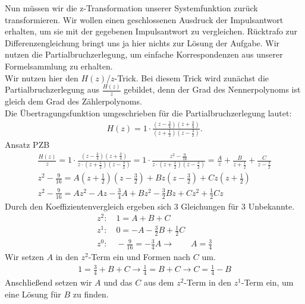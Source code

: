 \documentclass[11pt,a4paper,DIV=12]{scrartcl}
\begin{document}
Nun müssen wir die z-Transformation unserer Systemfunktion zurück
transformieren.
%
Wir wollen einen geschlossenen Ausdruck der Impulsantwort erhalten, um sie
mit der gegebenen Impulsantwort zu vergleichen.
%
Rücktrafo zur Differenzengleichung bringt uns ja hier nichts zur Lösung der
Aufgabe.
%
Wir nutzen die Partialbruchzerlegung, um einfache Korrespondenzen aus unserer
Formelsammlung zu erhalten.\\
%
Wir nutzen hier den $H(z)$/$z$-Trick.
%
Bei diesem Trick wird zunächst die Partialbruchzerlegung aus $\frac{H(z)}{z}$
%
gebildet, denn der Grad des Nennerpolynoms ist gleich dem Grad des
Zählerpolynoms.\\
%
Die Übertragungsfunktion umgeschrieben für die Partialbruchzerlegung lautet:
%
\begin{gather}
	H(z) = 1 \cdot \frac{\left(z - \frac{3}{4}\right)\left(z + \frac{3}{4}\right)}
	{\left(z+\frac{1}{2}\right)\left(z-\frac{3}{2}\right)}.
\end{gather}
%
Ansatz PZB
%
%
%
\begin{gather}
	\frac{H(z)}{z} =
	1 \cdot \frac{\left(z - \frac{3}{4}\right)\left(z + \frac{3}{4}\right)}
	{z \cdot \left(z+\frac{1}{2}\right)\left(z-\frac{3}{2}\right)}
	=1 \cdot \frac{z^2 - \frac{9}{16}}{z \cdot \left(z+\frac{1}{2}\right)\left(z-\frac{3}{2}\right)}
	=\frac{A}{z} + \frac{B}{z+\frac{1}{2}} + \frac{C}{z-\frac{3}{2}}\\
	z^2 - \frac{9}{16}
	=A \left(z+\frac{1}{2}\right)\left(z-\frac{3}{2}\right)
	+ B z \left(z-\frac{3}{2}\right) + C z \left(z+\frac{1}{2}\right)\\
	z^2 - \frac{9}{16}
	=A z^2 - A z - \frac{3}{4} A + B z^2 - \frac{3}{2} B z + C z^2 + \frac{1}{2} C z
\end{gather}
%
%
%
Durch den Koeffizientenvergleich ergeben sich $3$ Gleichungen für $3$
Unbekannte.
%
%
\begin{gather}
	z^2:\quad 1 = A+B+C\\
	z^1:\quad 0 = -A -\frac{3}{2}B + \frac{1}{2}C\\
	z^0:\quad -\frac{9}{16} = -\frac{3}{4}A \rightarrow \qquad A = \frac{3}{4}
\end{gather}
%
%
Wir setzen $A$ in den $z^2$-Term ein und Formen nach $C$ um.
%
%
\begin{gather}
	1 = \frac{3}{4}+B+C \rightarrow \frac{1}{4} = B + C \rightarrow C = \frac{1}{4} - B
\end{gather}
%
%
Anschließend setzen wir $A$ und das $C$ aus dem $z^2$-Term in den $z^1$-Term
ein, um eine Lösung für $B$ zu finden.
\end{document}

